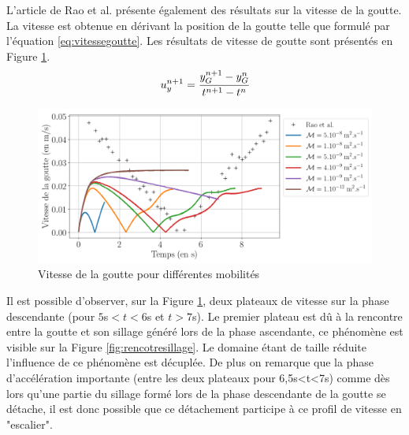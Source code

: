 L'article de Rao et al. présente également des résultats sur la vitesse de la goutte. La vitesse est obtenue en dérivant la position de la goutte telle que formulé par l'équation \ref{eq:vitessegoutte}. Les résultats de vitesse de goutte sont présentés en Figure \ref{fig:vitesseexp4}.
	\begin{equation} \label{eq:vitessegoutte}
	u_y^{n+1} = \cfrac{y_G^{n+1} - y_G^{n}}{t^{n+1}- t^n}
\end{equation}
\begin{figure}[H]
	\centering
	\includegraphics[width=0.9\linewidth]{figure/vitesse_Exp4}
	\caption[Vitesse de la goutte pour différentes mobilités]{Vitesse de la goutte pour différentes mobilités}
	\label{fig:vitesseexp4}
\end{figure}
Il est possible d'observer, sur la Figure \ref{fig:vitesseexp4}, deux plateaux de vitesse sur la phase descendante (pour $5$s$<t<6$s et $t>7$s). Le premier plateau est dû à la rencontre entre la goutte et son sillage généré lors de la phase ascendante, ce phénomène est visible sur la Figure \ref{fig:rencotresillage}. Le domaine étant de taille réduite l'influence de ce phénomène est décuplée. De plus on remarque que la phase d'accélération importante (entre les deux plateaux pour 6,5s<t<7s) comme dès lors qu'une partie du sillage formé lors de la phase descendante de la goutte se détache, il est donc possible que ce détachement participe à ce profil de vitesse en "escalier". 
